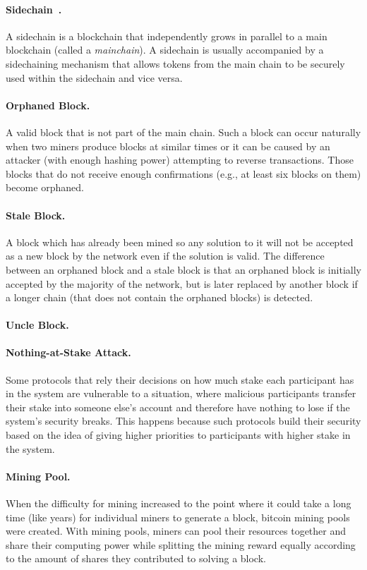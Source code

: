 \documentclass[11pt]{article}
\theoremstyle{mytheoremstyle}
\begin{document}
\paragraph{Sidechain~\cite{sidechains:2014}.} A sidechain is a blockchain that independently grows in parallel to a main blockchain (called a \emph{mainchain}). A sidechain is usually accompanied by a sidechaining mechanism that allows tokens from the main chain to be securely used within the sidechain and vice versa.

\paragraph{Orphaned Block.} A valid block that is not part of the main chain. Such a block can occur naturally when two miners produce blocks at similar times or it can be caused by an attacker (with enough hashing power) attempting to reverse transactions. Those blocks that do not receive enough confirmations (e.g., at least six blocks on them) become orphaned.

\paragraph{Stale Block.} A block which has already been mined so any solution to it will not be accepted as a new block by the network even if the solution is valid. The difference between an orphaned block and a stale block is that an orphaned block is initially accepted by the majority of the network, but is later replaced by another block if a longer chain (that does not contain the orphaned blocks) is detected.

\paragraph{Uncle Block.} 

\paragraph{Nothing-at-Stake Attack.} Some protocols that rely their decisions on how much stake each participant has in the system are vulnerable to a situation, where malicious participants transfer their stake into someone else's account and therefore have nothing to lose if the system's security breaks. This happens because such protocols build their security based on the idea of giving higher priorities to participants with higher stake in the system.

\paragraph{Mining Pool.} When the difficulty for mining increased to the
point where it could take a long time (like years) for individual
miners to generate a block, bitcoin mining pools were created. With
mining pools, miners can pool their resources together and share their
computing power while splitting the mining reward equally according
to the amount of shares they contributed to solving a block.
\end{document}

